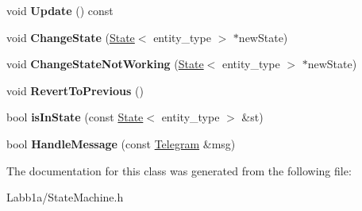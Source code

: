 \begin{DoxyCompactItemize}
\item 
\hypertarget{class_state_machine_a24b1f38171537058ab8040b3b42adb6c}{}void {\bfseries Update} () const \label{class_state_machine_a24b1f38171537058ab8040b3b42adb6c}

\item 
\hypertarget{class_state_machine_a916699645fd8deb8f0d757825d300d01}{}void {\bfseries Change\+State} (\hyperlink{class_state}{State}$<$ entity\+\_\+type $>$ $\ast$new\+State)\label{class_state_machine_a916699645fd8deb8f0d757825d300d01}

\item 
\hypertarget{class_state_machine_ac75b55d8ea42733057cca0775902324c}{}void {\bfseries Change\+State\+Not\+Working} (\hyperlink{class_state}{State}$<$ entity\+\_\+type $>$ $\ast$new\+State)\label{class_state_machine_ac75b55d8ea42733057cca0775902324c}

\item 
\hypertarget{class_state_machine_ab663cdc952a9ab03417d9ea79badbe92}{}void {\bfseries Revert\+To\+Previous} ()\label{class_state_machine_ab663cdc952a9ab03417d9ea79badbe92}

\item 
\hypertarget{class_state_machine_ab88d69e6b08a87ff14ad1e8e4440d8d4}{}bool {\bfseries is\+In\+State} (const \hyperlink{class_state}{State}$<$ entity\+\_\+type $>$ \&st)\label{class_state_machine_ab88d69e6b08a87ff14ad1e8e4440d8d4}

\item 
\hypertarget{class_state_machine_a657e50b3d54a1f93abc40978be52ea40}{}bool {\bfseries Handle\+Message} (const \hyperlink{struct_telegram}{Telegram} \&msg)\label{class_state_machine_a657e50b3d54a1f93abc40978be52ea40}

\end{DoxyCompactItemize}


The documentation for this class was generated from the following file\+:\begin{DoxyCompactItemize}
\item 
Labb1a/State\+Machine.\+h\end{DoxyCompactItemize}
